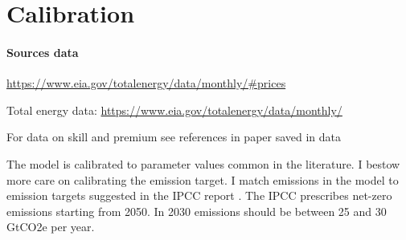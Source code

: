 \section{Calibration}\label{sec:calib}
\paragraph{Sources data}
\url{https://www.eia.gov/totalenergy/data/monthly/#prices}

Total energy data: \url{https://www.eia.gov/totalenergy/data/monthly/}

For data on skill and premium see references in 
paper saved in data \citep{Slavik2020WagePremium}

The model is calibrated to parameter values common in the literature. I bestow more care on  calibrating the emission target. 
I match emissions in the model to emission targets suggested in the IPCC report \citep{Rogelj2018MitigationDevelopment.}. 
The IPCC prescribes net-zero emissions starting from 2050. In 2030 emissions should be between 25 and 30 GtCO2e per year.


